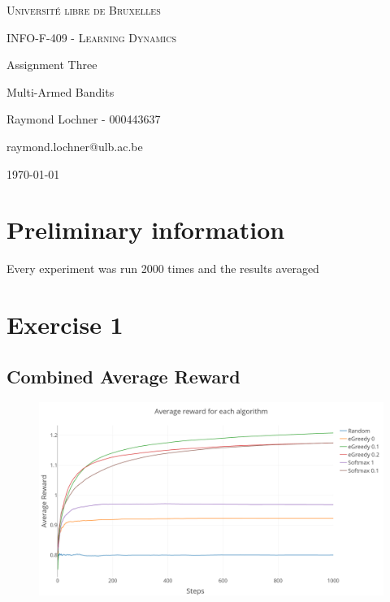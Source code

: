 \documentclass[a4paper, 11pt]{article}
\date{\today}
\begin{document}
\begin{titlepage}
	\centering
	{\scshape\LARGE Université libre de Bruxelles \par}
	\vspace{1cm}
	{\scshape\Large INFO-F-409 - Learning Dynamics\par}
	\vspace{1.5cm}
	{\huge\bfseries {Assignment Three\par}}
	\vspace{0.5cm}
	{\Large Multi-Armed Bandits\par}
	\vspace{2cm}
	{\Large Raymond Lochner - 000443637\par}
	\vspace{0.5cm}
	{\Large raymond.lochner@ulb.ac.be}
	\vfill
	
	\setcounter{tocdepth}{2} %
	\tableofcontents

\vfill
	{\large \today \par}
\end{titlepage}

\newpage

\section*{Preliminary information}

Every experiment was run 2000 times and the results averaged

\section{Exercise 1}
\subsection{Combined Average Reward}

\begin{figure}[H]
	\centering
    \includegraphics[width=1\linewidth]{ex1_1_average_rewards}
\end{figure}
\end{document}
